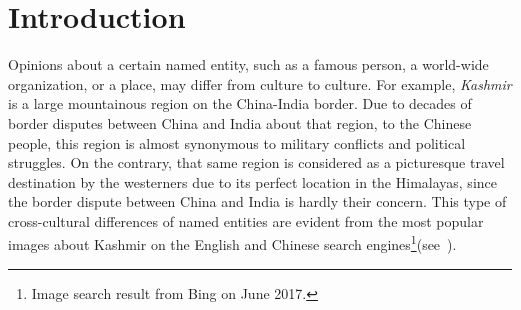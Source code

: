 \section{Introduction}
\label{sec:intro}
Opinions about a certain named entity,
such as a famous person, a world-wide organization, or a place,
may differ from culture to culture.
For example, \textit{Kashmir} is a large mountainous region on the China-India border.
Due to decades of border disputes between China and India
about that region, to the Chinese people, this region is
almost synonymous to military conflicts and political struggles.
On the contrary, that same region is considered as a picturesque travel
destination by the westerners due to its perfect location in the Himalayas,
since the border dispute between China and India is hardly their concern.
This type of cross-cultural differences of named entities are evident from the most popular
images about Kashmir on the English and Chinese search engines\footnote{Image search result from Bing on June 2017.}(see~).


%

